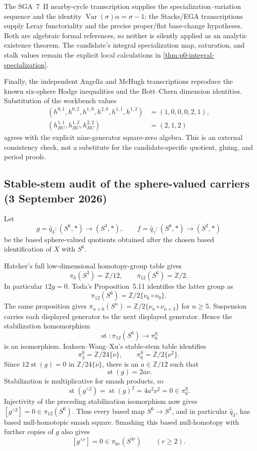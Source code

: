 The SGA~7~II nearby-cycle transcription supplies the specialization--variation
sequence and the identity $\operatorname{Var}(\sigma)\alpha=\sigma-1$;
the Stacks/EGA transcriptions supply Leray functoriality and the precise
proper/flat base-change hypotheses.  Both are algebraic formal references,
so neither is silently applied as an analytic existence theorem.  The
candidate's integral specialization map, saturation, and stalk values remain
the explicit local calculations in \cref{thm:p0-integral-specialization}.

Finally, the independent Angella and McHugh transcriptions reproduce the
known six-sphere Hodge inequalities and the Bott--Chern dimension identities.
Substitution of the workbench values
\[
\begin{aligned}
 (h^{0,1},h^{0,2},h^{1,0},h^{2,0},h^{1,1},h^{1,2})&=(1,0,0,0,2,1),\\
 (h^{1,1}_{BC},h^{1,2}_{BC},h^{2,2}_{BC})&=(2,1,2)
\end{aligned}
\]
agrees with the explicit nine-generator square-zero algebra.  This is an external
consistency check, not a substitute for the candidate-specific quotient,
gluing, and period proofs.

\subsection{Stable-stem audit of the sphere-valued carriers
(3 September 2026)}

Let
\[
 g=\widehat q_3:(S^6,*)\longrightarrow(S^3,*),
 \qquad
 f=\widehat q_\gamma:(S^6,*)\longrightarrow(S^2,*)
\]
be the based sphere-valued quotients obtained after the chosen based
identification of \(X\) with \(S^6\).

Hatcher's full low-dimensional homotopy-group table
\cite[p.~339]{Hatcher2002} gives
\[
 \pi_6(S^3)=\mathbb Z/12,
 \qquad
 \pi_{12}(S^6)=\mathbb Z/2.
\]
In particular \(12g=0\).  Toda's Proposition~5.11
\cite[Proposition~5.11]{Toda1962} identifies the latter group as
\[
 \pi_{12}(S^6)=\mathbb Z/2\{\nu_6\circ\nu_9\}.
\]
The same proposition gives
\(\pi_{n+6}(S^n)=\mathbb Z/2\{\nu_n\circ\nu_{n+3}\}\) for \(n\geq5\).
Suspension carries each displayed generator to the next displayed
generator.  Hence the stabilization homomorphism
\[
 \operatorname{st}:\pi_{12}(S^6)\longrightarrow\pi_6^{\mathrm S}
\]
is an isomorphism.  Isaksen--Wang--Xu's stable-stem table
\cite[Table~1, p.~113]{IsaksenWangXu2023} identifies
\[
 \pi_3^{\mathrm S}=\mathbb Z/24\{\nu\},
 \qquad
 \pi_6^{\mathrm S}=\mathbb Z/2\{\nu^2\}.
\]
Since \(12\operatorname{st}(g)=0\) in
\(\mathbb Z/24\{\nu\}\), there is an \(a\in\mathbb Z/12\) such that
\[
 \operatorname{st}(g)=2a\nu.
\]
Stabilization is multiplicative for smash products, so
\[
 \operatorname{st}(g^{\wedge2})
 =\operatorname{st}(g)^2
 =4a^2\nu^2=0\in\pi_6^{\mathrm S}.
\]
Injectivity of the preceding stabilization isomorphism now gives
\([g^{\wedge2}]=0\in\pi_{12}(S^6)\).  Thus every based map
\(S^6\to S^3\), and in particular \(\widehat q_3\), has based
null-homotopic smash square.  Smashing this based null-homotopy with
further copies of \(g\) also gives
\[
 [g^{\wedge r}]=0\in\pi_{6r}(S^{3r})\qquad(r\geq2).
\]


